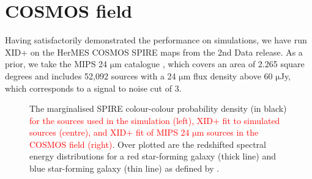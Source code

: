 \documentclass[useAMS,usenatbib]{mnras}
\begin{document}
\section{COSMOS field}\label{sec:COSMOS}
Having satisfactorily demonstrated the performance on simulations, we have run \textsc{XID+} on the HerMES COSMOS SPIRE maps from the 2nd Data release. As a prior, we take the MIPS 24 $\mathrm{\mu m}$ catalogue \citep{LeFLoch:2009}, which covers an area of 2.265 square degrees and includes 52,092 sources with a 24 $\mathrm{\mu m}$ flux density above 60 $\mathrm{\mu}$Jy, which corresponds to a signal to noise cut of 3.

\begin{figure}
\centering 
{}
\caption{The marginalised SPIRE colour-colour probability density (in black) \textcolor{red}{for the sources used in the simulation (left), \textsc{XID+} fit to simulated sources (centre), and \textsc{XID+} fit of MIPS 24 $\mathrm{\mu m}$ sources in the COSMOS field (right)}. Over plotted are the redshifted spectral energy distributions for a red star-forming galaxy (thick line) and blue star-forming galaxy (thin line) as defined by \protect\citep{Berta:2013}.}\label{fig:col-col}
\end{figure}
\end{document}
